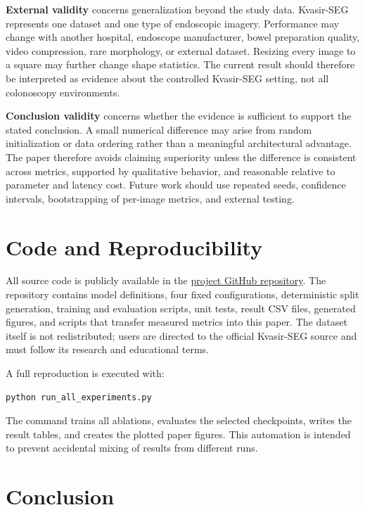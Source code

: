 \documentclass[a4paper,10pt]{article}
\begin{document}
\textbf{External validity} concerns generalization beyond the study data. Kvasir-SEG represents one dataset and one type of endoscopic imagery. Performance may change with another hospital, endoscope manufacturer, bowel preparation quality, video compression, rare morphology, or external dataset. Resizing every image to a square may further change shape statistics. The current result should therefore be interpreted as evidence about the controlled Kvasir-SEG setting, not all colonoscopy environments.

\textbf{Conclusion validity} concerns whether the evidence is sufficient to support the stated conclusion. A small numerical difference may arise from random initialization or data ordering rather than a meaningful architectural advantage. The paper therefore avoids claiming superiority unless the difference is consistent across metrics, supported by qualitative behavior, and reasonable relative to parameter and latency cost. Future work should use repeated seeds, confidence intervals, bootstrapping of per-image metrics, and external testing.

\FloatBarrier
{}
\section{Code and Reproducibility}

All source code is publicly available in the \href{https://github.com/hammiroussama/lightweight-transformer-unet-kvasir}{project GitHub repository}. The repository contains model definitions, four fixed configurations, deterministic split generation, training and evaluation scripts, unit tests, result CSV files, generated figures, and scripts that transfer measured metrics into this paper. The dataset itself is not redistributed; users are directed to the official Kvasir-SEG source and must follow its research and educational terms.

A full reproduction is executed with:
\begin{verbatim}
python run_all_experiments.py
\end{verbatim}
The command trains all ablations, evaluates the selected checkpoints, writes the result tables, and creates the plotted paper figures. This automation is intended to prevent accidental mixing of results from different runs.

\FloatBarrier
{}
\section{Conclusion}
\label{sec:conclusion}
\end{document}

